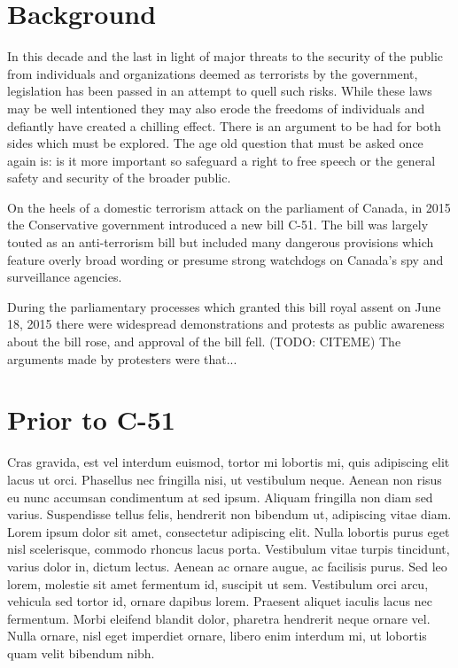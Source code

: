 \documentclass[a4paper, 11pt]{article} %
\begin{document}

\section*{Background}
In this decade and the last in light of major threats to the security of the public from individuals and organizations deemed as terrorists by the government, legislation has been passed in an attempt to quell such risks. While these laws may be well intentioned they may also erode the freedoms of individuals and defiantly have created a chilling effect. There is an argument to be had for both sides which must be explored. The age old question that must be asked once again is: is it more important so safeguard a right to free speech or the general safety and security of the broader public.

On the heels of a domestic terrorism attack on the parliament of Canada, in 2015 the Conservative government introduced a new bill C-51. The bill was largely touted as an anti-terrorism bill but included many dangerous provisions which feature overly broad wording or presume strong watchdogs on Canada's spy and surveillance agencies.

During the parliamentary processes which granted this bill royal assent on June 18, 2015 there were widespread demonstrations and protests as public awareness about the bill rose, and approval of the bill fell. (TODO: CITEME) The arguments made by protesters were that...


\section*{Prior to C-51}

Cras gravida, est vel interdum euismod, tortor mi lobortis mi, quis adipiscing elit lacus ut orci. Phasellus nec fringilla nisi, ut vestibulum neque. Aenean non risus eu nunc accumsan condimentum at sed ipsum.
Aliquam fringilla non diam sed varius. Suspendisse tellus felis, hendrerit non bibendum ut, adipiscing vitae diam. Lorem ipsum dolor sit amet, consectetur adipiscing elit. Nulla lobortis purus eget nisl scelerisque, commodo rhoncus lacus porta. Vestibulum vitae turpis tincidunt, varius dolor in, dictum lectus. Aenean ac ornare augue, ac facilisis purus. Sed leo lorem, molestie sit amet fermentum id, suscipit ut sem. Vestibulum orci arcu, vehicula sed tortor id, ornare dapibus lorem. Praesent aliquet iaculis lacus nec fermentum. Morbi eleifend blandit dolor, pharetra hendrerit neque ornare vel. Nulla ornare, nisl eget imperdiet ornare, libero enim interdum mi, ut lobortis quam velit bibendum nibh.
\end{document}
